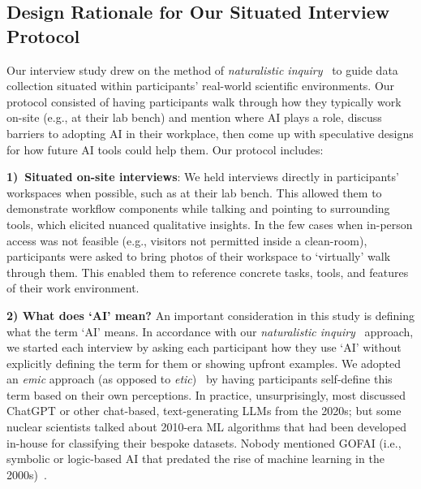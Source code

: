 \subsection{Design Rationale for Our Situated Interview Protocol}

Our interview study drew on the method of \emph{naturalistic inquiry}~\cite{lincoln1985naturalistic} to guide data collection situated within participants’ real-world scientific environments. Our protocol consisted of having participants walk through how they typically work on-site (e.g., at their lab bench) and mention where AI plays a role, discuss barriers to adopting AI in their workplace, then come up with speculative designs for how future AI tools could help them. Our protocol includes:

\smallskip \noindent \textbf{1)~Situated on-site interviews}:
We held interviews directly in participants' workspaces when possible, such as at their lab bench. This allowed them to demonstrate workflow components while talking and pointing to surrounding tools, which elicited nuanced qualitative insights.
%
In the few cases when in-person access was not feasible (e.g., visitors not permitted inside a clean-room), participants were asked to bring photos of their workspace to `virtually' walk through them. This enabled them to reference concrete tasks, tools, and features of their work environment.

\smallskip \noindent \textbf{2) What does `AI' mean? } An important consideration in this study is defining what the term `AI' means. In accordance with our \emph{naturalistic inquiry}~\cite{lincoln1985naturalistic} approach, we started each interview by asking each participant how they use `AI' without explicitly defining the term for them or showing upfront examples. We adopted an \emph{emic} approach (as opposed to \emph{etic})~\cite{emic_etic} by having participants self-define this term based on their own perceptions. In practice, unsurprisingly, most discussed ChatGPT or other chat-based, text-generating LLMs from the 2020s; but some nuclear scientists talked about 2010-era ML algorithms that had been developed in-house for classifying their bespoke datasets. Nobody mentioned GOFAI (i.e., symbolic or logic-based AI that predated the rise of machine learning in the 2000s)~\cite{gofai}.


